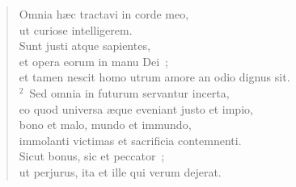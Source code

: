 \begin{flushleft}\begin{verse}\vspace{-19pt}Omnia h\ae c tractavi in corde meo,\\ ut curiose intelligerem.\\ Sunt justi atque sapientes,\\ et opera eorum in manu Dei~;\\ et tamen nescit homo utrum amore an odio dignus sit.\\
${}^{2}$~Sed omnia in futurum servantur incerta,\\ eo quod universa \ae que eveniant justo et impio,\\ bono et malo, mundo et immundo,\\ immolanti victimas et sacrificia contemnenti.\\ Sicut bonus, sic et peccator~;\\ ut perjurus, ita et ille qui verum dejerat.\end{verse}\end{flushleft}


